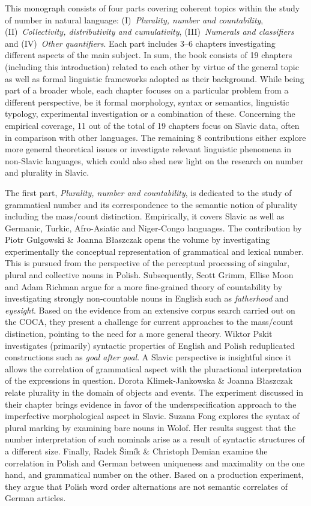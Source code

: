 \documentclass[output=paper]{langscibook}
\begin{document}
This monograph consists of four parts covering coherent topics within the study of number in natural language: (I)~\textit{Plurality, number and countability}, (II)~\textit{Collectivity, distributivity and cumulativity}, (III)~\textit{Numerals and classifiers} and (IV)~\textit{Other quantifiers}. Each part includes 3--6 chapters investigating different aspects of the main subject. In sum, the book consists of 19 chapters (including this introduction) related to each other by virtue of the general topic as well as formal linguistic frameworks adopted as their background. While being part of a broader whole, each chapter focuses on a particular problem from a different perspective, be it formal morphology, syntax or semantics, linguistic typology, experimental investigation or a combination of these. Concerning the empirical coverage, 11 out of the total of 19 chapters focus on Slavic data, often in comparison with other languages. The remaining 8 contributions either explore more general theoretical issues or investigate relevant linguistic phenomena in non-Slavic languages, which could also shed new light on the research on number and plurality in Slavic.

The first part, \textit{Plurality, number and countability}, is dedicated to the study of grammatical number and its correspondence to the semantic notion of plurality including the mass/count distinction. Empirically, it covers Slavic as well as Germanic, Turkic, Afro-Asiatic and Niger-Congo languages. The contribution by Piotr Gulgowski \& Joanna Błaszczak opens the volume by investigating experimentally the conceptual representation of grammatical and lexical number. This is pursued from the perspective of the perceptual processing of singular, plural and collective nouns in Polish. Subsequently, Scott Grimm, Ellise Moon and Adam Richman argue for a more fine-grained theory of countability by investigating strongly non-countable nouns in English such as \textit{fatherhood} and \textit{eyesight}. Based on the evidence from an extensive corpus search carried out on the COCA, they present a challenge for current approaches to the mass/count distinction, pointing to the need for a more general theory. Wiktor Pskit investigates (primarily) syntactic properties of English and Polish reduplicated constructions such as \textit{goal after goal}. A Slavic perspective is insightful since it allows the correlation of grammatical aspect with the pluractional interpretation of the expressions in question. Dorota Klimek-Jankowska \& Joanna Błaszczak relate plurality in the domain of objects and events. The experiment discussed in their chapter brings evidence in favor of the underspecification approach to the imperfective morphological aspect in Slavic. Suzana Fong explores the syntax of plural marking by examining bare nouns in Wolof. Her results suggest that the number interpretation of such nominals arise as a result of syntactic structures of a different size. Finally, Radek Šimík \& Christoph Demian examine the correlation in Polish and German between uniqueness and maximality on the one hand, and grammatical number on the other. Based on a production experiment, they argue that Polish word order alternations are not semantic correlates of German articles.
\end{document}
